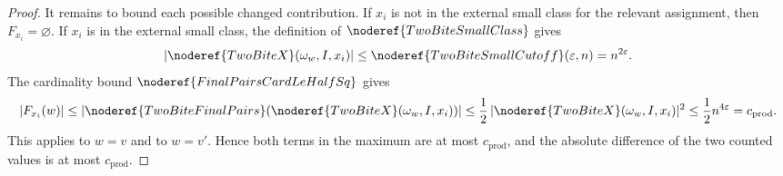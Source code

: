 \begin{proof}
It remains to bound each possible changed contribution.  If \(x_i\) is not in
the external small class for the relevant assignment, then
\(F_{x_i}=\varnothing\).  If \(x_i\) is in the external small class, the
definition of \(\noderef{TwoBiteSmallClass}\) gives
\[
|\noderef{TwoBiteX}(\omega_w,I,x_i)|
\le \noderef{TwoBiteSmallCutoff}(\varepsilon,n)=n^{2\varepsilon}.
\]
The cardinality bound \(\noderef{FinalPairsCardLeHalfSq}\) gives
\[
|F_{x_i}(w)|
\le
|\noderef{TwoBiteFinalPairs}(\noderef{TwoBiteX}(\omega_w,I,x_i))|
\le \frac12\,|\noderef{TwoBiteX}(\omega_w,I,x_i)|^2
\le \frac12 n^{4\varepsilon}=c_{\mathrm{prod}}.
\]
This applies to \(w=v\) and to \(w=v'\).  Hence both terms in the maximum are
at most \(c_{\mathrm{prod}}\), and the absolute difference of the two counted
values is at most \(c_{\mathrm{prod}}\).
\end{proof}
